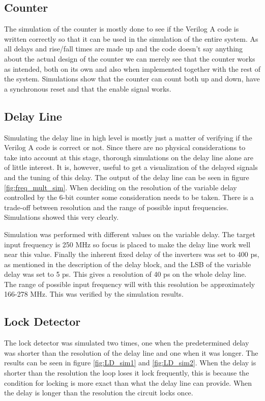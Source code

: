 \documentclass[a4paper,12pt]{article} \usepackage{graphicx}
\begin{document}
\subsection{Counter}
The simulation of the counter is mostly done to see if the Verilog A code is 
written correctly so that it can be used in the simulation of the entire system.
As all delays and rise/fall times are made up and the code doesn't say anything 
about the actual design of the counter we can merely see that the counter 
works as intended, both on its own and also when implemented together with
the rest of the system.
Simulations show that the counter can count both up and down, have a synchronous
reset and that the enable signal works.

\subsection{Delay Line}
Simulating the delay line in high level is mostly just a matter of
verifying if the Verilog A code is correct or not. Since there are no physical
considerations to take into account at this stage, thorough simulations
on the delay line alone are of little interest. It is, however, useful
to get a visualization of the delayed signals and the tuning of this
delay. The output of the delay line can be seen in figure
\ref{fig:freq_mult_sim}. 
When deciding on the resolution of the variable delay
controlled by the 6-bit counter some consideration needs to be taken. 
There is a trade-off between resolution and the
range of possible input frequencies. Simulations showed this very
clearly. 

Simulation was performed with different values on the variable
delay. The target input frequency is 250 MHz so focus is placed to make
the delay line work well near this value. Finally the inherent fixed
delay of the inverters was set to 400 ps, as mentioned in the
description of the delay block, and the
LSB of the variable delay was set to 5 ps. This gives a resolution of
40 ps on the whole delay line. The range of possible input frequency
will with this resolution be approximately 166-278 MHz. This was
verified by the simulation results.

\subsection{Lock Detector}
The lock detector was simulated two times, one when the predetermined 
delay was shorter than the resolution of the delay line and one when 
it was longer. The results can be seen in figure \ref{fig:LD_sim1} and 
\ref{fig:LD_sim2}. When the delay is shorter than the resolution
the loop loses it lock frequently, this is because the condition for 
locking is more exact than what the delay line can provide. When the 
delay is longer than the resolution the circuit locks once.
\end{document}

